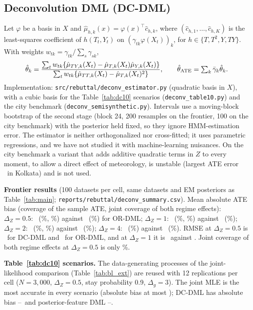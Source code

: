 \subsection{Deconvolution DML (DC-DML)}
\label{app:dcdml}
Let $\varphi$ be a basis in $X$ and $\hat\mu_{h,k}(x)=\varphi(x)^\top\hat c_{h,k}$, where $(\hat c_{h,1},\dots,\hat c_{h,K})$ is the least-squares coefficient of $h(T_t,Y_t)$ on $(\gamma_{tk}\varphi(X_t))_{k}$, for $h\in\{T,T^2,Y,TY\}$. With weights $w_{tk}=\gamma_{tk}/\sum_s\gamma_{sk}$,
\[
\hat\theta_k=\frac{\sum_tw_{tk}\{\hat\mu_{TY,k}(X_t)-\hat\mu_{T,k}(X_t)\hat\mu_{Y,k}(X_t)\}}{\sum_tw_{tk}\{\hat\mu_{TT,k}(X_t)-\hat\mu_{T,k}(X_t)^2\}},\qquad \hat\theta_{\rm ATE}=\textstyle\sum_k\bar\gamma_k\hat\theta_k.
\]
Implementation: \texttt{src/rebuttal/deconv\_estimator.py} (quadratic basis in $X$), with a cubic basis for the Table~\ref{tab:dc10} scenarios (\texttt{deconv\_table10.py}) and the city benchmark (\texttt{deconv\_semisynthetic.py}). Intervals use a moving-block bootstrap of the second stage (block 24, 200 resamples on the frontier, 100 on the city benchmark) with the posterior held fixed, so they ignore HMM-estimation error. The estimator is neither orthogonalized nor cross-fitted; it uses parametric regressions, and we have not studied it with machine-learning nuisances. On the city benchmark a variant that adds additive quadratic terms in $Z$ to every moment, to allow a direct effect of meteorology, is unstable (largest ATE error \RbDCZMaxKolkata\ in Kolkata) and is not used.

\textbf{Frontier results} (100 datasets per cell, same datasets and EM posteriors as Table~\ref{tab:main}; \texttt{reports/rebuttal/deconv\_summary.csv}). Mean absolute ATE bias (coverage of the sample ATE, joint coverage of both regime effects): $\Delta_Z=0.5$: \RbDCHalf\ (\RbDCCovHalf\%, \RbDCThCovHalf\%) against \RbORHalf\ (\RbORCovHalf\%) for OR-DML; $\Delta_Z=1$: \RbDCOne\ (\RbDCCovOne\%, \RbDCThCovOne\%) against \RbOROne\ (\RbORCovOne\%); $\Delta_Z=2$: \RbDCTwo\ (\RbDCCovTwo\%, \RbDCThCovTwo\%) against \RbORTwo\ (\RbORCovTwo\%); $\Delta_Z=4$: \RbDCFour\ (\RbDCCovFour\%) against \RbORFour\ (\RbORCovFour\%). RMSE at $\Delta_Z=0.5$ is \RbDCRmseHalf\ for DC-DML and \RbORRmseHalf\ for OR-DML, and at $\Delta_Z=1$ it is \RbDCRmseOne\ against \RbORRmseOne. Joint coverage of both regime effects at $\Delta_Z=0.5$ is only \RbDCThCovHalf\%.

\textbf{Table~\ref{tab:dc10} scenarios.} The data-generating processes of the joint-likelihood comparison (Table~\ref{tab:bl_ext}) are reused with 12 replications per cell ($N=3{,}000$, $\Delta_Z=0.5$, stay probability 0.9, $\Delta_g=3$). The joint MLE is the most accurate in every scenario (absolute bias at most \RbTenJointMax); DC-DML has absolute bias \RbTenDCMin--\RbTenDCMax\ and posterior-feature DML \RbTenDMLMin--\RbTenDMLMax.
\begin{table}[h]\centering\footnotesize
\caption{Mean bias (RMSE) of the ATE in the scenarios of Table~\ref{tab:bl_ext}: posterior-feature DML, joint Markov-switching MLE with a common effect, and DC-DML (\texttt{reports/rebuttal/deconv\_table10\_summary.csv}).}\label{tab:dc10}

\end{table}

